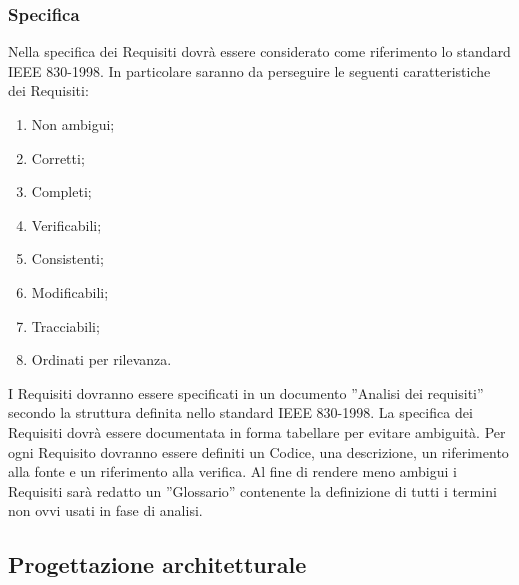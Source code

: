 {			\subsubsection{Specifica}{
				Nella specifica dei Requisiti dovrà essere considerato come riferimento lo standard IEEE 830-1998. In particolare saranno da perseguire le seguenti caratteristiche dei Requisiti:
				\begin{enumerate}
					\item Non ambigui;
					\item Corretti;
					\item Completi;
					\item Verificabili;
					\item Consistenti;
					\item Modificabili;
					\item Tracciabili;
					\item Ordinati per rilevanza.
				\end{enumerate}
				I Requisiti dovranno essere specificati in un documento ”Analisi dei requisiti” secondo la struttura definita nello standard IEEE 830-1998. La specifica dei Requisiti dovrà essere documentata in forma tabellare per evitare ambiguità. Per ogni Requisito dovranno essere definiti un Codice, una descrizione, un riferimento alla fonte e un riferimento alla verifica. Al fine di rendere meno ambigui i Requisiti sarà redatto un ”Glossario” contenente la definizione di tutti i termini non ovvi usati in fase di analisi.
			}

		}


   \subsection{Progettazione architetturale}
   
